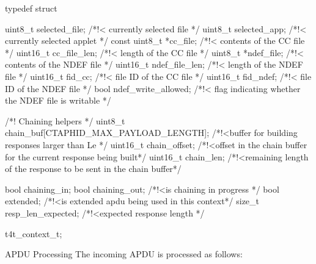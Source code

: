 \begtt
typedef struct
{
    uint8_t selected_file;      
    /*!< currently selected file */
    uint8_t selected_app;       
    /*!< currently selected applet */
    const uint8_t *cc_file;     
    /*!< contents of the CC file */
    uint16_t cc_file_len;       
    /*!< length of the CC file */
    uint8_t *ndef_file;        
    /*!< contents of the NDEF file */
    uint16_t ndef_file_len;     
    /*!< length of the NDEF file */
    uint16_t fid_cc;            
    /*!< file ID of the CC file */
    uint16_t fid_ndef;          
    /*!< file ID of the NDEF file */
    bool ndef_write_allowed;    
    /*!< flag indicating whether the NDEF file is writable */

    /*! Chaining helpers */
    uint8_t chain_buf[CTAPHID_MAX_PAYLOAD_LENGTH]; 
    /*!<buffer for building responses larger than Le */
    uint16_t chain_offset;                          
    /*!<offset in the chain buffer for the current response being built*/
    uint16_t chain_len;                             
    /*!<remaining length of the response to be sent in the chain buffer*/

    bool chaining_in;
    bool chaining_out;
    /*!<is chaining in progress */
    bool extended;
    /*!<is extended apdu being used in this context*/
    size_t resp_len_expected;
    /*!<expected response length */
} t4t_context_t;
\endtt

 APDU Processing
The incoming APDU is processed as follows:

